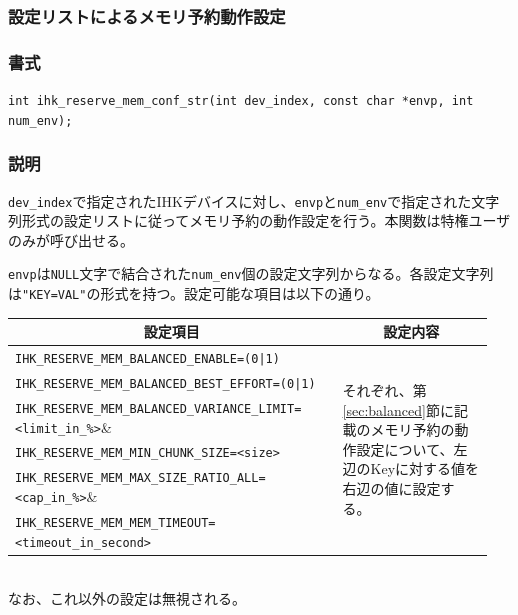 \documentclass[twoside,11pt,fleqn]{book}
\begin{document}
\subsubsection{設定リストによるメモリ予約動作設定}
\subsubsection*{書式}{\quad} \verb:int ihk_reserve_mem_conf_str(int dev_index, const char *envp, int num_env);:
\subsubsection*{説明}{\quad} \verb:dev_index:で指定されたIHKデバイスに対し、\verb:envp:と\verb:num_env:で指定された文字列形式の設定リストに従ってメモリ予約の動作設定を行う。本関数は特権ユーザのみが呼び出せる。

\verb:envp:は\verb:NULL:文字で結合された\verb:num_env:個の設定文字列からなる。各設定文字列は\verb:"KEY=VAL":の形式を持つ。設定可能な項目は以下の通り。
\begin{table}[!h]
\footnotesize
\begin{tabular}{|p{0.65\linewidth}|p{0.30\linewidth}|} \hline
\multicolumn{1}{|c}{\textbf{設定項目}}&\multicolumn{1}{|c|}{\textbf{設定内容}}\\ \hline \hline
\verb:IHK_RESERVE_MEM_BALANCED_ENABLE=(0|1):&\multirow{6}{\linewidth}{それぞれ、第\ref{sec:balanced}節に記載のメモリ予約の動作設定について、左辺のKeyに対する値を右辺の値に設定する。}\\
\verb:IHK_RESERVE_MEM_BALANCED_BEST_EFFORT=(0|1):&\\
\verb:IHK_RESERVE_MEM_BALANCED_VARIANCE_LIMIT=<limit_in_%>:&\\
\verb:IHK_RESERVE_MEM_MIN_CHUNK_SIZE=<size>:&\\
\verb:IHK_RESERVE_MEM_MAX_SIZE_RATIO_ALL=<cap_in_%>:&\\
\verb:IHK_RESERVE_MEM_MEM_TIMEOUT=<timeout_in_second>:&\\ \hline
\end{tabular}
\vspace{-0em}
\end{table}
\\なお、これ以外の設定は無視される。
\FloatBarrier
\end{document}
